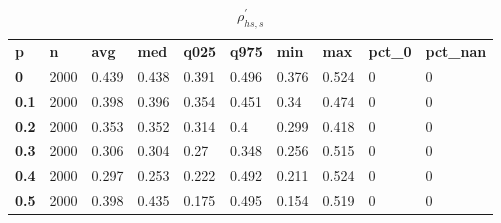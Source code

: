 \begin{table}[h]
 \centering 
\footnotesize
\caption{$\rho_{hs,s}^\prime $}
\label{tab:alphahss}
\begin{tabular}[h]{| l l l l l l l l l l|
    } \hline
\textbf{ p} & \textbf{ n} & \textbf{ avg} & \textbf{ med} & \textbf{ q025} & \textbf{ q975} & \textbf{ min} & \textbf{ max} & \textbf{ pct\_0} & \textbf{ pct\_nan}
           \\
  \textbf{  0} & 2000 & 0.439 & 0.438 & 0.391 & 0.496 & 0.376 & 0.524 & 0 & 0
           \\
  \textbf{0.1} & 2000 & 0.398 & 0.396 & 0.354 & 0.451 &  0.34 & 0.474 & 0 & 0
           \\
  \textbf{0.2} & 2000 & 0.353 & 0.352 & 0.314 &   0.4 & 0.299 & 0.418 & 0 & 0
           \\
  \textbf{0.3} & 2000 & 0.306 & 0.304 &  0.27 & 0.348 & 0.256 & 0.515 & 0 & 0
           \\
  \textbf{0.4} & 2000 & 0.297 & 0.253 & 0.222 & 0.492 & 0.211 & 0.524 & 0 & 0
           \\
  \textbf{0.5} & 2000 & 0.398 & 0.435 & 0.175 & 0.495 & 0.154 & 0.519 & 0 & 0
           \\
 \hline \end{tabular}
 \end{table}
